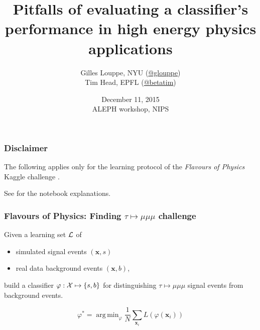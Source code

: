 \documentclass{beamer}
\title{{\bf Pitfalls of evaluating a classifier's performance in high energy physics applications}}
\author{
Gilles Louppe, NYU (\href{https://twitter.com/glouppe}{@glouppe}) \\
Tim Head, EPFL (\href{https://twitter.com/betatim}{@betatim}) \\
}
\date{December 11, 2015\\
ALEPH workshop, NIPS}
\DeclareMathOperator*{\argmin}{arg\,min}
\begin{document}
\begin{frame}[plain]
\titlepage
\end{frame}


\begin{frame}
\frametitle{Disclaimer}

The following applies {\color{red} only} for the learning protocol of the {\it
Flavours of Physics} Kaggle challenge \citep{blake2014}.

\vspace{1cm}

See \citep{louppe2014} for the notebook explanations.

\end{frame}


\begin{frame}
\frametitle{Flavours of Physics: Finding $\tau \mapsto \mu\mu\mu$ challenge}

Given a learning set ${\cal L}$ of

\vspace{0.5cm}

\begin{itemize}
\item simulated signal events $(\mathbf{x}, s)$
\item real data background events $(\mathbf{x}, b)$,
\end{itemize}

\vspace{0.5cm}

build a classifier $\varphi : {\cal X} \mapsto \{s, b\}$ for distinguishing
$\tau \mapsto \mu\mu\mu$ signal events from background events.

$$\varphi^* = \argmin_\varphi \frac{1}{N} \sum_{\mathbf{x}_i} L(\varphi(\mathbf{x}_i))$$

\end{frame}

\end{document}
